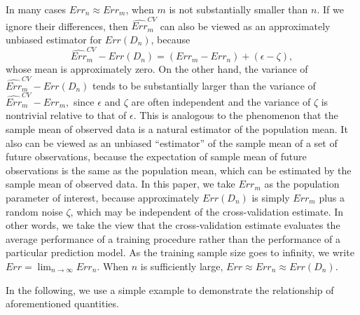 \documentclass[12pt]{article}
\begin{document}
In many cases $Err_n\approx Err_m$, when $m$ is not substantially smaller than $n.$ If we ignore their differences, then $\widehat{Err}^{CV}_m$ can also be viewed as an approximately unbiased estimator for $Err(D_n)$, because 
$$\widehat{Err}^{CV}_m-Err(D_n)=(Err_m-Err_n)+(\epsilon-\zeta),$$ 
whose mean is approximately zero. On the other hand, the variance of 
$\widehat{Err}^{CV}_m-Err(D_n)$ tends to be substantially larger than the variance of $\widehat{Err}^{CV}_m-Err_m,$ since $\epsilon$ and $\zeta$ are often independent and the variance of $\zeta$ is nontrivial relative to that of $\epsilon$. This is analogous to the phenomenon that the sample mean of observed data is a natural estimator of the population mean. It also can be viewed as an unbiased ``estimator'' of the sample mean of a set of future observations, because the expectation of sample mean of future observations is the same as the population mean, which can be estimated by the sample mean of observed data.  In this paper, we take $Err_m$ as the population parameter of interest, because approximately $Err(D_n)$ is simply $Err_m$ plus a random noise $\zeta$, which may be independent of the cross-validation estimate.  In other words, we take the view that the cross-validation estimate evaluates the average performance of a training procedure rather than the performance of a particular prediction model.  As the training sample size goes to infinity, we write $Err=\lim_{n\rightarrow \infty}Err_n.$ When $n$ is sufficiently large, $Err\approx Err_n \approx Err(D_n).$

In the following, we use a simple example to demonstrate the relationship of aforementioned quantities. 
\end{document}
